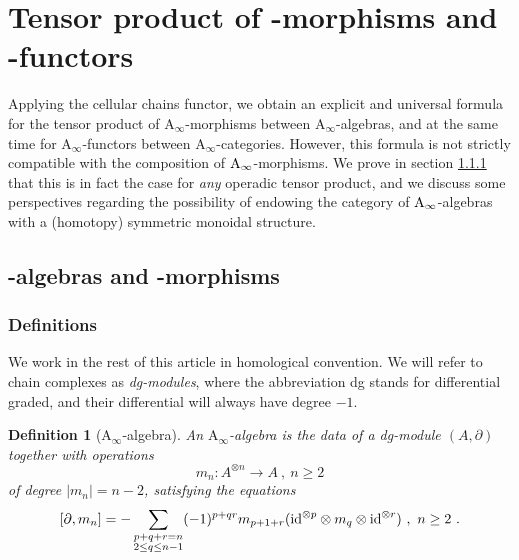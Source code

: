 \documentclass[twoside, 12pt]{amsart}
\newtheorem{definition}{Definition}[section]
\theoremstyle{remark}
\begin{document}

\section{Tensor product of \Ainf -morphisms and \Ainf -functors}
\label{sec:IV}


Applying the cellular chains functor, we obtain an explicit and universal formula for the tensor product of $\mathrm{A}_\infty$-morphisms between $\mathrm{A}_\infty$-algebras, and at the same time for $\mathrm{A}_\infty$-functors between $\mathrm{A}_\infty$-categories. 
However, this formula is not strictly compatible with the composition of $\mathrm{A}_\infty$-morphisms. 
We prove in section \ref{} that this is in fact the case for \emph{any} operadic tensor product, and we discuss some perspectives regarding the possibility of endowing the category of $\mathrm{A}_\infty$-algebras with a (homotopy) symmetric monoidal structure. 

\subsection{\Ainf -algebras and \Ainf -morphisms}

\subsubsection{Definitions}

We work in the rest of this article in homological convention. We will refer to chain complexes as \emph{dg-modules}, where the abbreviation dg stands for differential graded, and their differential will always have degree $-1$.

\begin{definition}[$\mathrm{A}_\infty$-algebra] \label{def:ainf-alg} An \emph{$\mathrm{A}_\infty$-algebra} is the data of a dg-module $(A,\partial)$ together with operations \[ m_n : A^{\otimes n} \to A \ , \ n \geq 2 \] of degree $|m_n|=n-2$, satisfying the equations 
\[ [ \partial , m_n ] = - \sum_{\substack{p+q+r=n \\ 2 \leq q \leq n-1}} (-1)^{p+qr}m_{p+1+r}(\mathrm{id}^{\otimes p} \otimes m_q \otimes \mathrm{id}^{\otimes r}) \ , \ n\geq 2 \ . \]
\end{definition}
\end{document}
